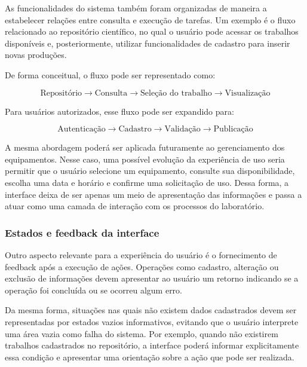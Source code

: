 As funcionalidades do sistema também foram organizadas de maneira a
estabelecer relações entre consulta e execução de tarefas. Um exemplo é o
fluxo relacionado ao repositório científico, no qual o usuário pode acessar
os trabalhos disponíveis e, posteriormente, utilizar funcionalidades de
cadastro para inserir novas produções.

De forma conceitual, o fluxo pode ser representado como:

\begin{equation}
	\text{Repositório}
	\rightarrow
	\text{Consulta}
	\rightarrow
	\text{Seleção do trabalho}
	\rightarrow
	\text{Visualização}
\end{equation}

Para usuários autorizados, esse fluxo pode ser expandido para:

\begin{equation}
	\text{Autenticação}
	\rightarrow
	\text{Cadastro}
	\rightarrow
	\text{Validação}
	\rightarrow
	\text{Publicação}
\end{equation}

A mesma abordagem poderá ser aplicada futuramente ao gerenciamento dos
equipamentos. Nesse caso, uma possível evolução da experiência de uso seria
permitir que o usuário selecione um equipamento, consulte sua
disponibilidade, escolha uma data e horário e confirme uma solicitação de
uso. Dessa forma, a interface deixa de ser apenas um meio de apresentação
das informações e passa a atuar como uma camada de interação com os
processos do laboratório.

\subsubsection{Estados e feedback da interface}

Outro aspecto relevante para a experiência do usuário é o fornecimento de
feedback após a execução de ações. Operações como cadastro, alteração ou
exclusão de informações devem apresentar ao usuário um retorno indicando se
a operação foi concluída ou se ocorreu algum erro.

Da mesma forma, situações nas quais não existem dados cadastrados devem ser
representadas por estados vazios informativos, evitando que o usuário
interprete uma área vazia como falha do sistema. Por exemplo, quando não
existirem trabalhos cadastrados no repositório, a interface poderá informar
explicitamente essa condição e apresentar uma orientação sobre a ação que
pode ser realizada.

